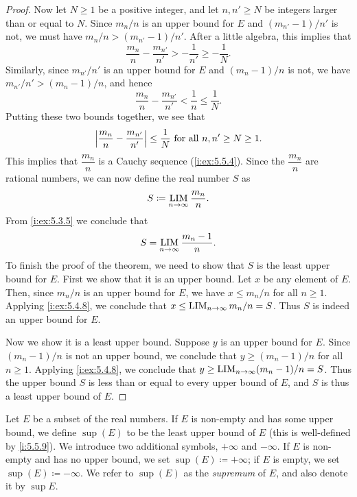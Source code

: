 \begin{proof}
  Now let \(N \geq 1\) be a positive integer, and let \(n, n' \geq N\) be integers larger than or equal to \(N\).
  Since \(m_n / n\) is an upper bound for \(E\) and \((m_{n'} - 1) / n'\) is not, we must have \(m_n / n > (m_{n'} - 1) / n'\).
  After a little algebra, this implies that
  \[
    \dfrac{m_n}{n} - \dfrac{m_{n'}}{n'} > -\dfrac{1}{n'} \geq -\dfrac{1}{N}.
  \]
  Similarly, since \(m_{n'} / n'\) is an upper bound for \(E\) and \((m_n - 1) / n\) is not, we have \(m_{n'} / n' > (m_n - 1) / n\), and hence
  \[
    \dfrac{m_n}{n} - \dfrac{m_{n'}}{n'} < \dfrac{1}{n} \leq \dfrac{1}{N}.
  \]
  Putting these two bounds together, we see that
  \[
    \left\lvert\dfrac{m_n}{n} - \dfrac{m_{n'}}{n'}\right\rvert \leq \dfrac{1}{N} \text{ for all } n, n' \geq N \geq 1.
  \]
  This implies that \(\dfrac{m_n}{n}\) is a Cauchy sequence (\cref{i:ex:5.5.4}).
  Since the \(\dfrac{m_n}{n}\) are rational numbers, we can now define the real number \(S\) as
  \[
    S \coloneqq \operatorname*{LIM}_{n \to \infty} \dfrac{m_n}{n}.
  \]
  From \cref{i:ex:5.3.5} we conclude that
  \[
    S = \operatorname*{LIM}_{n \to \infty} \dfrac{m_n - 1}{n}.
  \]
  To finish the proof of the theorem, we need to show that \(S\) is the least upper bound for \(E\).
  First we show that it is an upper bound.
  Let \(x\) be any element of \(E\).
  Then, since \(m_n / n\) is an upper bound for \(E\), we have \(x \leq m_n / n\) for all \(n \geq 1\).
  Applying \cref{i:ex:5.4.8}, we conclude that \(x \leq \operatorname*{LIM}_{n \to \infty} m_n / n = S\).
  Thus \(S\) is indeed an upper bound for \(E\).

  Now we show it is a least upper bound.
  Suppose \(y\) is an upper bound for \(E\).
  Since \((m_n - 1) / n\) is not an upper bound, we conclude that \(y \geq (m_n - 1) / n\) for all \(n \geq 1\).
  Applying \cref{i:ex:5.4.8}, we conclude that \(y \geq \operatorname*{LIM}_{n \to \infty} (m_n - 1) / n = S\).
  Thus the upper bound \(S\) is less than or equal to every upper bound of \(E\), and \(S\) is thus a least upper bound of \(E\).
\end{proof}

\begin{defn}[Supremum]\label{i:5.5.10}
  Let \(E\) be a subset of the real numbers.
  If \(E\) is non-empty and has some upper bound, we define \(\sup(E)\) to be the least upper bound of \(E\)
  (this is well-defined by \cref{i:5.5.9}).
  We introduce two additional symbols, \(+\infty\) and \(-\infty\).
  If \(E\) is non-empty and has no upper bound, we set \(\sup(E) \coloneqq +\infty\);
  if \(E\) is empty, we set \(\sup(E) \coloneqq -\infty\).
  We refer to \(\sup(E)\) as the \emph{supremum} of \(E\), and also denote it by \(\sup E\).
\end{defn}

